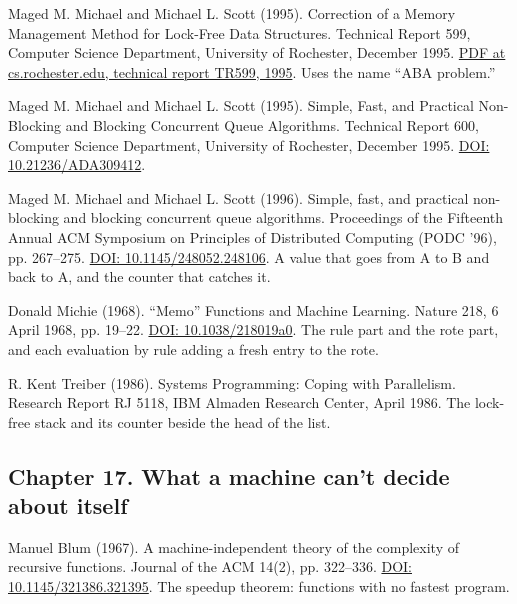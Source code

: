 \documentclass[11pt,twoside]{article}
\theoremstyle{thielethm}
\theoremstyle{thieledef}
\theoremstyle{thieledef}
\theoremstyle{thieledef}
\theoremstyle{thielethm}
\theoremstyle{thieleobs}
\theoremstyle{thielethm}
\begin{document}
\noindent Maged M. Michael and Michael L. Scott (1995). Correction of a Memory Management Method for Lock-Free Data Structures. Technical Report 599, Computer Science Department, University of Rochester, December 1995. \href{https://www.cs.rochester.edu/u/scott/papers/1995_TR599.pdf}{PDF at cs.rochester.edu, technical report TR599, 1995}. Uses the name ``ABA problem.''
\par\medskip

\noindent Maged M. Michael and Michael L. Scott (1995). Simple, Fast, and Practical Non-Blocking and Blocking Concurrent Queue Algorithms. Technical Report 600, Computer Science Department, University of Rochester, December 1995. \href{https://doi.org/10.21236/ADA309412}{DOI: 10.21236/ADA309412}.
\par\medskip

\noindent Maged M. Michael and Michael L. Scott (1996). Simple, fast, and practical non-blocking and blocking concurrent queue algorithms. Proceedings of the Fifteenth Annual ACM Symposium on Principles of Distributed Computing (PODC '96), pp. 267--275. \href{https://doi.org/10.1145/248052.248106}{DOI: 10.1145/248052.248106}. A value that goes from A to B and back to A, and the counter that catches it.
\par\medskip

\noindent Donald Michie (1968). ``Memo'' Functions and Machine Learning. Nature 218, 6 April 1968, pp. 19--22. \href{https://doi.org/10.1038/218019a0}{DOI: 10.1038/218019a0}. The rule part and the rote part, and each evaluation by rule adding a fresh entry to the rote.
\par\medskip

\noindent R. Kent Treiber (1986). Systems Programming: Coping with Parallelism. Research Report RJ 5118, IBM Almaden Research Center, April 1986. The lock-free stack and its counter beside the head of the list.
\par\medskip

\subsection*{Chapter 17. What a machine can't decide about itself}

\noindent Manuel Blum (1967). A machine-independent theory of the complexity of recursive functions. Journal of the ACM 14(2), pp. 322--336. \href{https://doi.org/10.1145/321386.321395}{DOI: 10.1145/321386.321395}. The speedup theorem: functions with no fastest program.
\par\medskip
\end{document}
